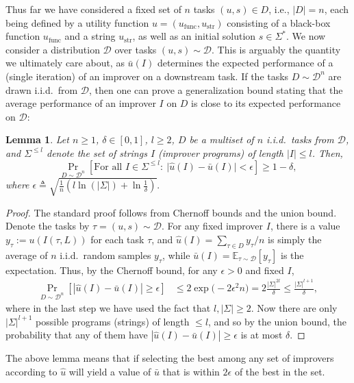 \documentclass{article}
\newtheorem{lemma}{Lemma}
\def\eps{{\epsilon}}
\newcommand{\E}{\mathbb{E}}
\newcommand{\metautil}{{\hat{u}}}
\newcommand{\exputil}{{\bar{u}}}
\newcommand{\sol}{{s}}
\newcommand{\D}{{\mathcal{D}}}
\newcommand{\defeq}{\triangleq}
\begin{document}
Thus far we have considered a fixed set of $n$ tasks $(u, \sol) \in D$, i.e., $|D|=n$, each being defined by a utility function $u=(u_\text{func}, u_\text{str})$ consisting of a black-box function $u_\text{func}$ and a string $u_\text{str}$, as well as an initial solution $\sol \in \Sigma^*$. We now consider a distribution $\D$ over tasks $(u, \sol) \sim \D$. 
This is arguably the quantity we ultimately care about, as $\exputil(I)$ determines the expected performance of a (single iteration) of an improver on a downstream task. 
If the tasks $D\sim \D^n$ are drawn i.i.d.\ from $\D$, then one can prove a generalization bound stating that the average performance of an improver $I$ on $D$ is close to its expected performance on $\D$:
\begin{lemma}
    Let $n \ge 1$, $\delta \in [0,1]$, $l \ge 2$, $D$ be a multiset of $n$ i.i.d.\ tasks from $\D$, and $\Sigma^{\le l}$ denote the set of strings $I$ (improver programs) of length $|I| \le l$. Then, 
    $$\Pr_{D\sim \D^n}\left[\text{For all } I \in \Sigma^{\le l}:~\bigl|\metautil(I) - \exputil(I)\bigr| < \epsilon\right] \ge 1-\delta,$$
    where $\eps \defeq \sqrt{\frac{1}{n}\left(l \ln(|\Sigma|) + \ln \frac{1}{\delta}\right)}.$
\end{lemma}
\begin{proof}
The standard proof follows from Chernoff bounds and the union bound. Denote the tasks by $\tau=(u, \sol)\sim \D$.  For any fixed improver $I$, there is a value $y_\tau:= u(I(\tau, L))$ for each task $\tau$, and $\metautil(I)=\sum_{\tau \in D}y_\tau/n$ is simply the average of $n$ i.i.d.\ random samples $y_\tau$, while $\exputil(I)=\E_{\tau \sim \D}[y_\tau]$ is the expectation. 
Thus, by the Chernoff bound, 
for any $\epsilon > 0$ and fixed $I$,
\begin{align*}
\Pr_{D\sim \D^n}\left[\left|\metautil(I) - \exputil(I)\right| \ge \epsilon\right] &\le 2\exp\bigl(-2\epsilon^2 n\bigr)
=2\frac{|\Sigma|^{2l}}{\delta}
\le \frac{|\Sigma|^{l+1}}{\delta},
\end{align*}
where in the last step we have used the fact that $l, |\Sigma| \ge 2$. Now there are only $|\Sigma|^{l+1}$ possible programs (strings) of length $\le l$, and so by the union bound, the probability that any of them have $|\metautil(I) - \exputil(I)| \ge \epsilon$ is at most $\delta$.
\end{proof}
The above lemma means that if selecting the best among any set of improvers according to $\metautil$ will yield a value of $\exputil$ that is within $2\eps$ of the best in the set.
\end{document}
